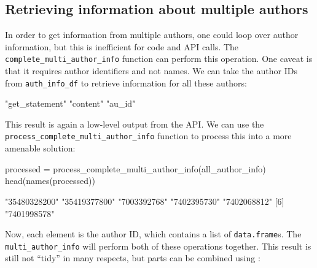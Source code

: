 \hypertarget{retrieving-information-about-multiple-authors}{%
\subsection{Retrieving information about multiple
authors}\label{retrieving-information-about-multiple-authors}}

In order to get information from multiple authors, one could loop over
author information, but this is inefficient for code and API calls. The
\texttt{complete\_multi\_author\_info} function can perform this
operation. One caveat is that it requires author identifiers and not
names. We can take the author IDs from \texttt{auth\_info\_df} to
retrieve information for all these authors:

\begin{Schunk}
\begin{Soutput}
[1] "get_statement" "content"       "au_id"        
\end{Soutput}
\end{Schunk}

This result is again a low-level output from the API. We can use the
\texttt{process\_complete\_multi\_author\_info} function to process this
into a more amenable solution:

\begin{Schunk}
\begin{Sinput}
processed = process_complete_multi_author_info(all_author_info)
head(names(processed))
\end{Sinput}
\begin{Soutput}
[1] "35480328200" "35419377800" "7003392768"  "7402395730"  "7402068812" 
[6] "7401998578" 
\end{Soutput}
\end{Schunk}

Now, each element is the author ID, which contains a list of
\texttt{data.frame}s. The \texttt{multi\_author\_info} will perform both
of these operations together. This result is still not ``tidy''
\citep{wickham2014tidy} in many respects, but parts can be combined
using  \citep{purrr}:

